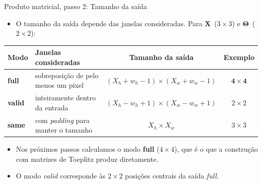 \documentclass[aspectratio=169,xcolor=dvipsnames]{beamer}
\begin{document}
\begin{frame}{Produto matricial, passo 2: Tamanho da saída}
\begin{itemize}
    \item O tamanho da saída depende das janelas consideradas. Para $\mathbf{X}$~($3\times 3$) e $\mathbf{\Theta}$~($2\times 2$):
\end{itemize}
\vspace{0.4em}
\centering
{\small
\begin{tabular}{llcc}
    \toprule
    Modo & Janelas consideradas & Tamanho da saída & Exemplo \\
    \midrule
    \rowcolor{orange!15}
    \textbf{full} & sobreposição de pelo menos um pixel & $(X_h + w_h - 1)\times(X_w + w_w - 1)$ & $\mathbf{4\times 4}$ \\
    \textbf{valid} & inteiramente dentro da entrada & $(X_h - w_h + 1)\times(X_w - w_w + 1)$ & $2\times 2$ \\
    \textbf{same} & com \textit{padding} para manter o tamanho & $X_h \times X_w$ & $3\times 3$ \\
    \bottomrule
\end{tabular}
}
\vspace{0.6em}
\begin{itemize}
    \item Nos próximos passos calculamos o modo \textbf{full} ($4\times 4$), que é o que a construção com matrizes de Toeplitz produz diretamente.
    \item O modo \textit{valid} corresponde às $2\times 2$ posições centrais da saída \textit{full}.
\end{itemize}
\end{frame}
\end{document}

